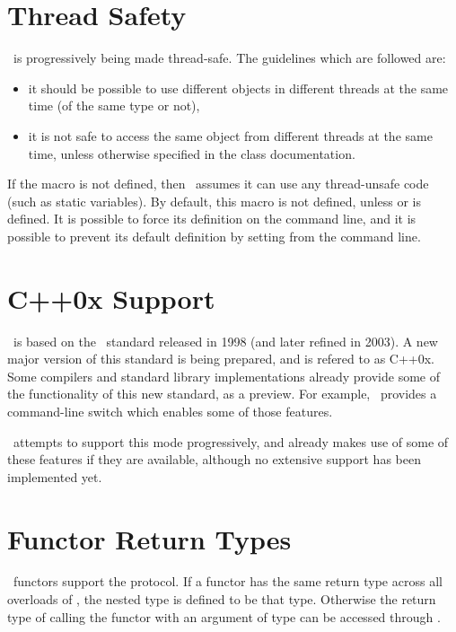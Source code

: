 \section{Thread Safety}

\cgal\ is progressively being made thread-safe.  The guidelines which are followed
are:
\begin{itemize}
\item it should be possible to use different objects in different threads at
the same time (of the same type or not),
\item it is not safe to access the same object from different threads
at the same time, unless otherwise specified in the class documentation.
\end{itemize}

If the macro  is not defined, then \cgal\ assumes it can use
any thread-unsafe code (such as static variables).  By default, this macro is not
defined, unless  or  is defined.  It is possible
to force its definition on the command line, and it is possible to prevent its default
definition by setting  from the command line.


\section{C++0x Support}

\cgal\ is based on the \CC\ standard released in 1998 (and later refined in 2003).
A new major version of this standard is being prepared, and is refered to as C++0x.
Some compilers and standard library implementations already provide some of the
functionality of this new standard, as a preview.  For example, \gcc\ provides
a command-line switch  which enables some of those features.

\cgal\ attempts to support this mode progressively, and already makes use of
some of these features if they are available, although no extensive support has
been implemented yet.

\section{Functor Return Types}

\cgal\ functors support the
protocol. If a functor  has the same return type across all
overloads of , the nested type
 is defined to be that type. Otherwise the
return type of calling the functor with an argument of type
 can be accessed through
.

